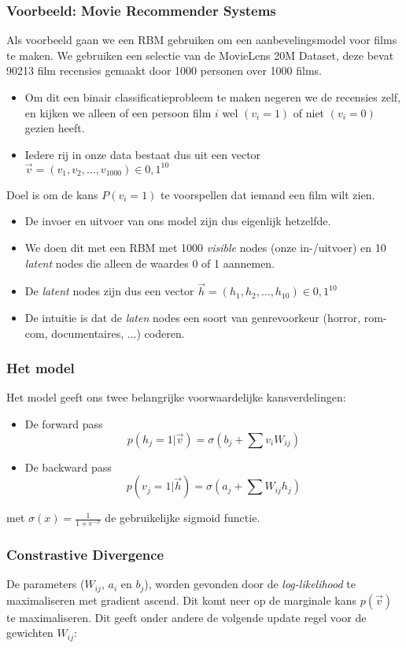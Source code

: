 {\subsubsection{Voorbeeld: Movie Recommender Systems}
Als voorbeeld gaan we een RBM gebruiken om een aanbevelingsmodel voor films te maken. We gebruiken een selectie van de MovieLens 20M Dataset, deze bevat 90213 film recensies gemaakt door 1000 personen over 1000 films.
\begin{itemize}
    \item Om dit een binair classificatieprobleem te maken negeren we de recensies zelf, en kijken we alleen of een persoon film $i$ wel $(v_i=1)$ of niet $(v_i=0)$ gezien heeft.
    \item Iedere rij in onze data bestaat dus uit een vector $\vec{v}=(v_1,v_2,\ldots,v_{1000})\in {0,1}^{10}$
\end{itemize}
\noindent Doel is om de kans $P(v_i=1)$ te voorspellen dat iemand een film wilt zien.
\begin{itemize}
    \item De invoer en uitvoer van ons model zijn dus eigenlijk hetzelfde.
    \item We doen dit met een RBM met 1000 \textit{visible} nodes (onze in-/uitvoer) en 10 \textit{latent} nodes die alleen de waardes 0 of 1 aannemen.
    \item De \textit{latent} nodes zijn dus een vector $\vec{h}=(h_1,h_2,\ldots,h_{10})\in {0,1}^{10}$
    \item De intuitie is dat de \textit{laten} nodes een soort van genrevoorkeur (horror, rom-com, documentaires, ...) coderen.
\end{itemize}
\subsubsection{Het model}
Het model geeft ons twee belangrijke voorwaardelijke kansverdelingen:
\begin{itemize}
    \item De forward pass
    \[p(h_j=1|\vec{v})=\sigma(b_j+\sum v_iW_{ij})\]
    \item De backward pass
    \[p(v_j=1|\vec{h})=\sigma(a_j+\sum W_{ij}h_j)\]
\end{itemize}
\noindent met $\sigma (x)=\frac{1}{1+e^{-x}}$ de gebruikelijke sigmoid functie.

\subsubsection{Constrastive Divergence}
De parameters ($W_{ij}$, $a_i$ en $b_j$), worden gevonden door de \textit{log-likelihood} te maximaliseren met gradient ascend. Dit komt neer op de marginale kans $p(\vec{v})$ te maximaliseren. Dit geeft onder andere de volgende update regel voor de gewichten $W_{ij}$:

}

